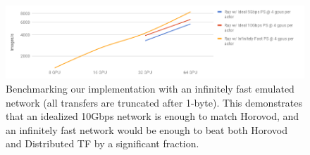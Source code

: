 


\begin{figure}[tb]
    \centering
    \includegraphics[width=5.1in,keepaspectratio]{fig/infnet.png}
    \caption{
    \small{
        Benchmarking our implementation with an infinitely fast emulated network (all transfers are truncated after 1-byte). This demonstrates that an idealized 10Gbps network is enough to match Horovod, and an infinitely fast network would be enough to beat both Horovod and Distributed TF by a significant fraction.
    }
    }
    \label{fig:infnet}
\end{figure}


